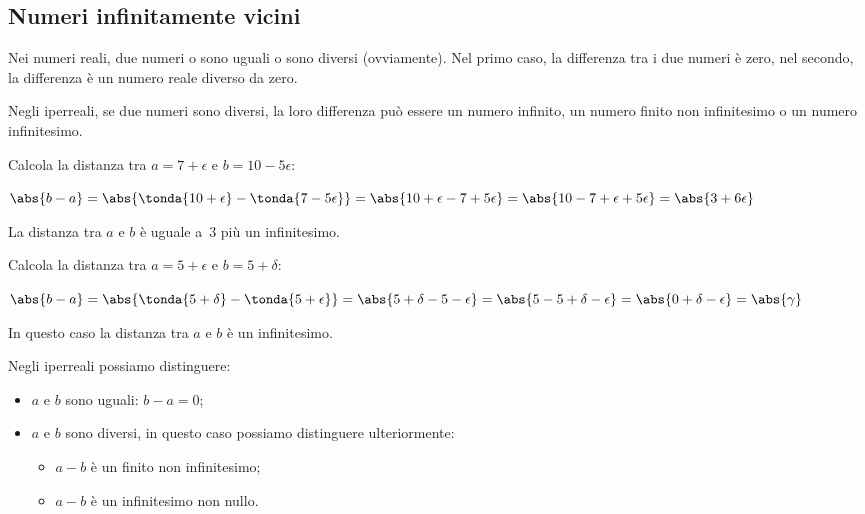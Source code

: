 \begin{esempio}
\begin{enumerate}
\end{enumerate}
\end{esempio}

\subsection{Numeri infinitamente vicini}
\label{subsec:insnum_infinitamentevicini}


Nei numeri reali, due numeri o sono uguali o sono diversi (ovviamente).
Nel primo caso, la differenza tra i due numeri è zero, 
nel secondo, la differenza è un numero reale diverso da zero.

Negli iperreali, se due numeri sono diversi, la loro differenza può 
essere un numero infinito, un numero finito non infinitesimo o un numero 
infinitesimo.

\begin{esempio}
 Calcola la distanza tra \(a=7+\epsilon\) e \(b=10-5\epsilon\):
 
 \(\abs{b-a}=\abs{\tonda{10+\epsilon} - \tonda{7-5\epsilon}}=
   \abs{10+\epsilon - 7+5\epsilon}=
   \abs{10-7 + \epsilon+5\epsilon}=
   \abs{3 + 6\epsilon}
 \)
 
 La distanza tra \(a\) e \(b\) è uguale a~3 più un infinitesimo.
\end{esempio}

\begin{esempio}
 Calcola la distanza tra \(a=5+\epsilon\) e \(b=5+\delta\):
 
 \(\abs{b-a}=\abs{\tonda{5+\delta} - \tonda{5+\epsilon}}=
   \abs{5+\delta - 5-\epsilon}=
   \abs{5-5 + \delta - \epsilon}=
   \abs{0 + \delta - \epsilon} = \abs{\gamma}
 \)
 
 In questo caso la distanza tra \(a\) e \(b\) è un infinitesimo.
\end{esempio}

\noindent Negli iperreali possiamo distinguere:

\begin{itemize} [noitemsep]
 \item \(a\) e \(b\) sono uguali: \(b-a=0\);
 \item \(a\) e \(b\) sono diversi, in questo caso possiamo distinguere
 ulteriormente:
\begin{itemize} [nosep]
 \item \(a-b\) è un finito non infinitesimo;
 \item \(a-b\) è un infinitesimo non nullo.
\end{itemize}
\end{itemize}

